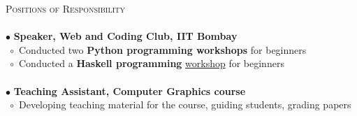 \documentclass[a4paper,9pt]{article}
\begin{document}
\textcolor{myrust}{\large{\textsc{Positions of Responsibility}}}\textcolor{mygray}{\sout{\hfill}}\\\\
\normalsize
$\bullet$ \textbf{Speaker, Web and Coding Club, IIT Bombay}\\
$\;\circ$ Conducted two \textbf{Python programming workshops} for beginners\\
$\;\circ$ Conducted a \textbf{Haskell programming} \href{http://wenderen.github.io/wncc-sessions/#/}{workshop} for beginners\\\\
$\bullet$ \textbf{Teaching Assistant, Computer Graphics course}\\
$\;\circ$ Developing teaching material for the course, guiding students, grading papers\\
\end{document}
